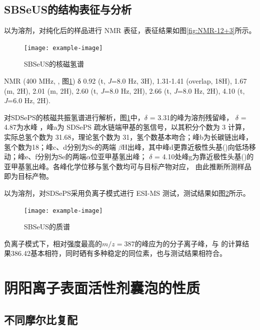 \documentclass[bachelor,fandolfonts,replaceperiod]{jnuthesis}
\begin{document}
    \subsection{SBSeUS的结构表征与分析}
        以为溶剂，对纯化后的样品进行     NMR 表征，表征结果如图\ref{fig:NMR-12+3}所示。
    \begin{figure}[htbp]
        \centering
        \texttt{[image: example-image]}\\
        \caption{SBSeUS的核磁氢谱}\label{fig:SBSeUS-nmr}
    \end{figure}
    
     NMR (400 MHz, , 图\ref{fig:SBSeUS-nmr}) δ 0.92 (t, \textit{J}=8.0 Hz, 3H), 1.31-1.41 (overlap, 18H), 
    1.67 (m, 2H), 2.01 (m, 2H), 2.60 (t, \textit{J}=8.0 Hz, 2H), 2.66 (t, \textit{J}=8.0 Hz, 2H),  4.10 (t, \textit{J}=6.0 Hz, 2H).
    
    对SDSePS的核磁共振氢谱进行解析，图\ref{fig:SBSeUS-nmr}中，$\delta$ = 3.31的峰为溶剂残留峰，
    $\delta$ = 4.87为水峰\cite{babij2016nmr} ，峰a为 SDSePS 疏水链端甲基的氢信号，以其积分个数为 3 计算，
    实际总氢个数为 31.68，理论氢个数为 31，氢个数基本吻合；峰b为长碳链出峰，氢个数为18；峰c、d分别为Se的两端
    $\beta$H出峰，其中峰d更靠近极性头基()向低场移动；峰e、f分别为Se的两端$\alpha$位亚甲基氢出峰；
    $\delta$ = 4.10处峰g为靠近极性头基()的亚甲基氢出峰。各峰化学位移与氢个数均可与目标产物对应，
    由此推断所测样品即为目标产物。
    
    以为溶剂，对SDSePS采用负离子模式进行 ESI-MS 测试，测试结果如图\ref{fig:SBSeUS-mass}所示。
    \begin{figure}[htbp]
        \centering
        \texttt{[image: example-image]}\\
        \caption{SBSeUS的质谱}\label{fig:SBSeUS-mass}
    \end{figure}
    
    负离子模式下，相对强度最高的$m/z = 387$的峰应为的分子离子峰，与
    的计算结果386.42基本相符，同时硒有多种稳定的同位素，也与测试结果相符合。

    \section{阴阳离子表面活性剂囊泡的性质}
    \subsection{不同摩尔比复配}
\end{document}
